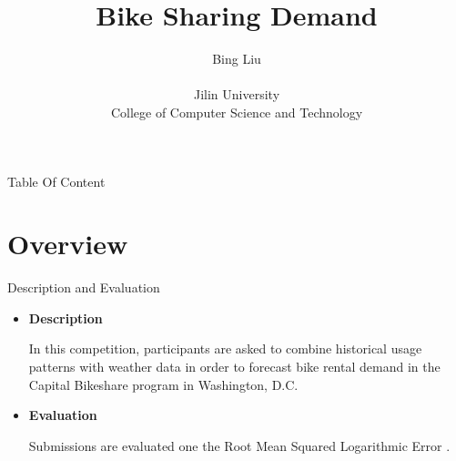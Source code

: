 \documentclass[
 size=14pt,
 paper=smartboard,  %
 mode=present, 		%
 display=slides, 	%
 style=tuliplab,  	%
 pauseslide,
 fleqn,leqno]{powerdot}
\title{Bike Sharing Demand}
\author{
Bing Liu
\\
\\Jilin University
\\College of Computer Science and Technology
}
\date{\gitCommitterDate}
\renewcommand{\raggedright}{\leftskip=0pt \rightskip=0pt plus 0cm}
\begin{document}
\maketitle



\begin{slide}[toc=,bm=]{Table Of Content}
\tableofcontents[content=currentsection,type=1]
\end{slide}


\section{Overview}

\begin{slide}{Description and Evaluation}

\begin{itemize}
\item \textbf{Description}

\medskip    %
In this competition, participants are asked to combine historical usage patterns with weather data in order to forecast bike rental demand in the Capital Bikeshare program in Washington, D.C.

\bigskip
\bigskip
\item \textbf{Evaluation}

\medskip
Submissions are evaluated one the Root Mean Squared Logarithmic Error . 

\end{itemize}

\end{slide}

\end{document}
